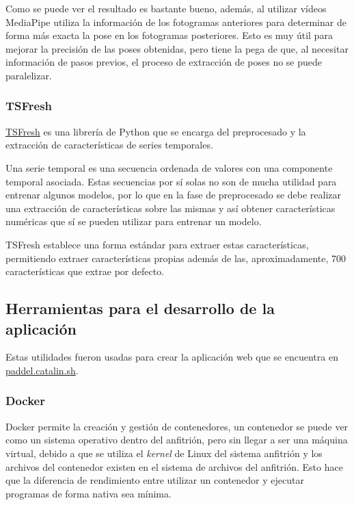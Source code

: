 Como se puede ver el resultado es bastante bueno, además, al utilizar vídeos
MediaPipe utiliza la información de los fotogramas anteriores para determinar de
forma más exacta la pose en los fotogramas posteriores. Esto es muy útil para
mejorar la precisión de las poses obtenidas, pero tiene la pega de que, al
necesitar información de pasos previos, el proceso de extracción de poses no se
puede paralelizar.

\subsubsection{TSFresh}

\href{https://github.com/blue-yonder/tsfresh}{TSFresh} \cite{christ2018time} es
una librería de Python que se encarga del preprocesado y la extracción de
características de series temporales.

Una serie temporal es una secuencia ordenada de valores con una componente
temporal asociada. Estas secuencias por sí solas no son de mucha utilidad para
entrenar algunos modelos, por lo que en la fase de preprocesado se debe realizar
una extracción de características sobre las mismas y así obtener características
numéricas que sí se pueden utilizar para entrenar un modelo.

TSFresh establece una forma estándar para extraer estas características,
permitiendo extraer características propias además de las, aproximadamente, 700
características que extrae por defecto.

\subsection{Herramientas para el desarrollo de la aplicación}

Estas utilidades fueron usadas para crear la aplicación web que se encuentra en
\href{https://paddel.catalin.sh}{paddel.catalin.sh}.

\subsubsection{Docker}

Docker permite la creación y gestión de contenedores, un contenedor se puede ver
como un sistema operativo dentro del anfitrión, pero sin llegar a ser una
máquina virtual, debido a que se utiliza el \textit{kernel} de Linux del sistema
anfitrión y los archivos del contenedor existen en el sistema de archivos del
anfitrión. Esto hace que la diferencia de rendimiento entre utilizar un
contenedor y ejecutar programas de forma nativa sea mínima.

